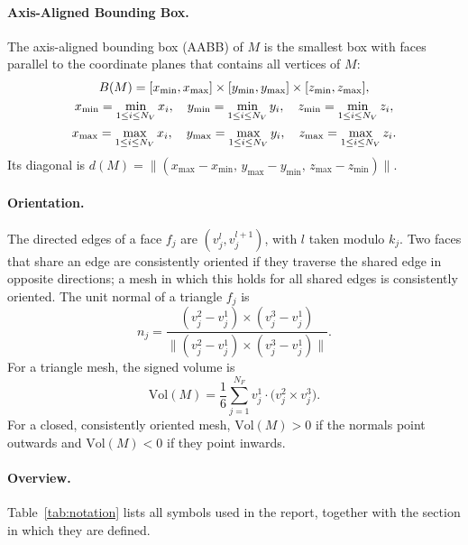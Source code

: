 \documentclass[10pt,a4paper]{article}
\begin{document}
\paragraph{Axis-Aligned Bounding Box.}
The axis-aligned bounding box (AABB) of $M$ is the smallest box with faces parallel to the coordinate planes that contains all
vertices of $M$:
\begin{gather}
  B(M)=[x_{\min},x_{\max}]\times[y_{\min},y_{\max}]\times[z_{\min},z_{\max}],\label{eq:aabb}\\
  x_{\min}=\min_{1\le i\le N_V}x_i,\quad y_{\min}=\min_{1\le i\le N_V}y_i,\quad z_{\min}=\min_{1\le i\le N_V}z_i,\notag\\
  x_{\max}=\max_{1\le i\le N_V}x_i,\quad y_{\max}=\max_{1\le i\le N_V}y_i,\quad z_{\max}=\max_{1\le i\le N_V}z_i .\notag
\end{gather}
Its diagonal is $d(M)=\lVert(x_{\max}-x_{\min},\,y_{\max}-y_{\min},\,z_{\max}-z_{\min})\rVert$.

\paragraph{Orientation.}
The directed edges of a face $f_j$ are $(v_j^l,v_j^{l+1})$, with $l$ taken modulo $k_j$. Two faces that share an edge are
consistently oriented if they traverse the shared edge in opposite directions; a mesh in which this holds for all shared edges
is consistently oriented. The unit normal of a triangle $f_j$ is
\begin{equation}
  n_j=\frac{(v_j^2-v_j^1)\times(v_j^3-v_j^1)}{\lVert(v_j^2-v_j^1)\times(v_j^3-v_j^1)\rVert}.
  \label{eq:normal}
\end{equation}
For a triangle mesh, the signed volume is
\begin{equation}
  \mathrm{Vol}(M)=\frac16\sum_{j=1}^{N_F} v_j^1\cdot\big(v_j^2\times v_j^3\big).
  \label{eq:signedvolume}
\end{equation}
For a closed, consistently oriented mesh, $\mathrm{Vol}(M)>0$ if the normals point outwards and $\mathrm{Vol}(M)<0$ if they
point inwards.

\paragraph{Overview.}
Table~\ref{tab:notation} lists all symbols used in the report, together with the section in which they are defined.
\end{document}
